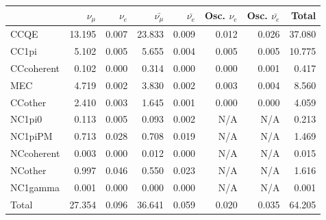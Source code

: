 
\begin{table}
\center
\begin{tabular} { | l ||r | r | r | r | r | r | | r | }
\hline

              & $\nu_\mu$            & $\nu_e$              & $\bar{\nu_\mu}$      & $\bar{\nu_e}$        & Osc. $\nu_e$         & Osc. $\bar{\nu_e}$   & Total                \\ \hline\hline
 CCQE         & 13.195               & 0.007                & 23.833               & 0.009                & 0.012                & 0.026                & 37.080               \\ \hline
 CC1pi        & 5.102                & 0.005                & 5.655                & 0.004                & 0.005                & 0.005                & 10.775               \\ \hline
 CCcoherent   & 0.102                & 0.000                & 0.314                & 0.000                & 0.000                & 0.001                & 0.417                \\ \hline
 MEC          & 4.719                & 0.002                & 3.830                & 0.002                & 0.003                & 0.004                & 8.560                \\ \hline
 CCother      & 2.410                & 0.003                & 1.645                & 0.001                & 0.000                & 0.000                & 4.059                \\ \hline
 NC1pi0       & 0.113                & 0.005                & 0.093                & 0.002                & N/A                  & N/A                  & 0.213                \\ \hline
 NC1piPM      & 0.713                & 0.028                & 0.708                & 0.019                & N/A                  & N/A                  & 1.469                \\ \hline
 NCcoherent   & 0.003                & 0.000                & 0.012                & 0.000                & N/A                  & N/A                  & 0.015                \\ \hline
 NCother      & 0.997                & 0.046                & 0.550                & 0.023                & N/A                  & N/A                  & 1.616                \\ \hline
 NC1gamma     & 0.001                & 0.000                & 0.000                & 0.000                & N/A                  & N/A                  & 0.001                \\ \hline
\hline
 Total        & 27.354               & 0.096                & 36.641               & 0.059                & 0.020                & 0.035                & 64.205               \\ \hline



\end{tabular}
\end{table}
